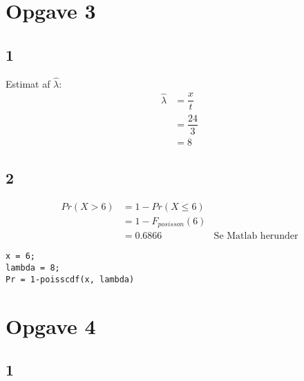 \documentclass{article}
\begin{document}

\section*{Opgave 3} %
\label{sec:opgave_3}

\subsection*{1} %
Estimat af $\hat{\lambda}$:
\begin{align}
\hat{\lambda} &= \dfrac{x}{t} \\
	&= \dfrac{24}{3} \\
	&= 8
\end{align}


\subsection*{2} %
\begin{align}
Pr\left(X > 6 \right) &= 1 - Pr(X \leq 6) \\
	&= 1- F_{posisson}(6)\\
	&= 0.6866 & \text{Se Matlab herunder}
\end{align}

\begin{lstlisting}[caption=Kode for Opg 3.2, style=Code-Matlab, label=lst:opg32]
x = 6;
lambda = 8;
Pr = 1-poisscdf(x, lambda)
\end{lstlisting}



\newpage
\section*{Opgave 4} %
\label{sec:opgave_4}

\subsection*{1} %



\end{document}
